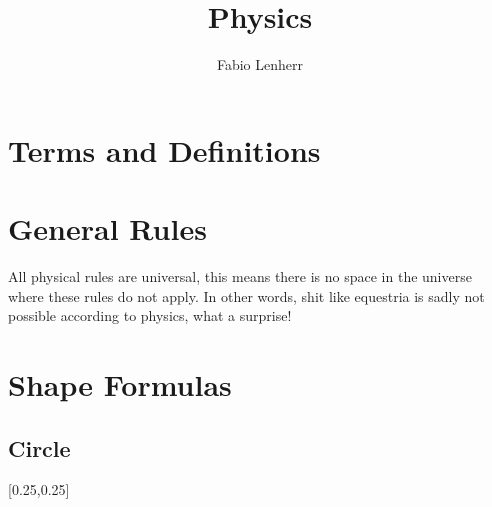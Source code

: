 \documentclass[main.tex,fontsize=8pt,paper=a4,paper=portrait,DIV=calc,]{scrartcl}
\title{Physics}
\author{Fabio Lenherr}
\begin{document}
\tableofcontents
\pagebreak

\section{Terms and Definitions}

\begin{multicols*}{2}

\section{General Rules}
All physical rules are universal, this means there is no space in the universe where these rules do not apply.\newline
In other words, shit like equestria is sadly not possible according to physics, what a surprise!

\section{Shape Formulas}
\subsection{Circle}
[0.25,0.25]


\end{multicols*}
\end{document}
